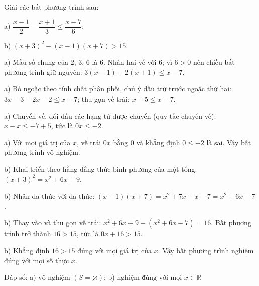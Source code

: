 \begin{problem}[9DS-BPT-024]
Giải các bất phương trình sau:

a) $\dfrac{x - 1}{2} - \dfrac{x + 1}{3} \leq \dfrac{x - 7}{6}$;

b) $(x + 3)^2 - (x - 1)(x + 7) > 15$.

\begin{solution}
a) Mẫu số chung của $2$, $3$, $6$ là $6$. Nhân hai vế với $6$; vì $6 > 0$ nên chiều bất phương trình giữ nguyên: $3(x - 1) - 2(x + 1) \leq x - 7$.

a) Bỏ ngoặc theo tính chất phân phối, chú ý dấu trừ trước ngoặc thứ hai: $3x - 3 - 2x - 2 \leq x - 7$; thu gọn vế trái: $x - 5 \leq x - 7$.

a) Chuyển vế, đổi dấu các hạng tử được chuyển (quy tắc chuyển vế): $x - x \leq -7 + 5$, tức là $0x \leq -2$.

a) Với mọi giá trị của $x$, vế trái $0x$ bằng $0$ và khẳng định $0 \leq -2$ là sai. Vậy bất phương trình vô nghiệm.

b) Khai triển theo hằng đẳng thức bình phương của một tổng: $(x + 3)^2 = x^2 + 6x + 9$.

b) Nhân đa thức với đa thức: $(x - 1)(x + 7) = x^2 + 7x - x - 7 = x^2 + 6x - 7$.

b) Thay vào và thu gọn vế trái: $x^2 + 6x + 9 - (x^2 + 6x - 7) = 16$. Bất phương trình trở thành $16 > 15$, tức là $0x + 16 > 15$.

b) Khẳng định $16 > 15$ đúng với mọi giá trị của $x$. Vậy bất phương trình nghiệm đúng với mọi số thực $x$.

Đáp số: a) $\boxed{\text{vô nghiệm } (S = \varnothing)}$; b) $\boxed{\text{nghiệm đúng với mọi } x \in \mathbb{R}}$
\end{solution}
\end{problem}

